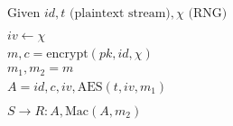 \documentclass{article}
\newcommand{\rng}{\chi}
\begin{document}
\begin{align*}
& \text{Given~} id, t \text{~(plaintext stream)}, \rng \text{~(RNG)} \\
\\
& iv \longleftarrow \rng \\
& m, c = \text{encrypt}(pk, id, \rng) \\
& m_1, m_2 = m \\
& A = id, c, iv, \text{AES}(t, iv, m_1) \\
\\
& S \longrightarrow R: A, \text{Mac}(A, m_2)
\end{align*}
\end{document}
